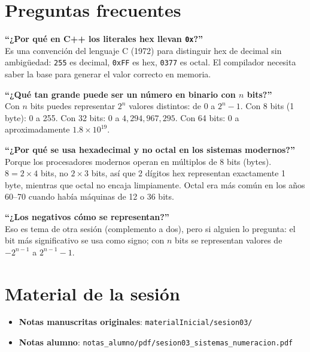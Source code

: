 \documentclass[12pt, oneside]{article}
\begin{document}
\section{Preguntas frecuentes}

\begin{notaprofesor}[FAQ]

\textbf{``¿Por qué en C++ los literales hex llevan \texttt{0x}?''}\\
Es una convención del lenguaje C (1972) para distinguir hex de decimal sin
ambigüedad: \texttt{255} es decimal, \texttt{0xFF} es hex, \texttt{0377}
es octal. El compilador necesita saber la base para generar el valor
correcto en memoria.

\vspace{0.6em}
\textbf{``¿Qué tan grande puede ser un número en binario con $n$ bits?''}\\
Con $n$ bits puedes representar $2^n$ valores distintos: de 0 a $2^n - 1$.
Con 8 bits (1 byte): 0 a 255. Con 32 bits: 0 a $4{,}294{,}967{,}295$.
Con 64 bits: 0 a aproximadamente $1.8 \times 10^{19}$.

\vspace{0.6em}
\textbf{``¿Por qué se usa hexadecimal y no octal en los sistemas modernos?''}\\
Porque los procesadores modernos operan en múltiplos de 8 bits (bytes).
$8 = 2 \times 4$ bits, no $2 \times 3$ bits, así que 2 dígitos hex
representan exactamente 1 byte, mientras que octal no encaja limpiamente.
Octal era más común en los años 60–70 cuando había máquinas de 12 o 36 bits.

\vspace{0.6em}
\textbf{``¿Los negativos cómo se representan?''}\\
Eso es tema de otra sesión (complemento a dos), pero si alguien lo pregunta:
el bit más significativo se usa como signo; con $n$ bits se representan
valores de $-2^{n-1}$ a $2^{n-1}-1$.
\end{notaprofesor}

\section{Material de la sesión}

\begin{itemize}
  \item \textbf{Notas manuscritas originales}: \texttt{materialInicial/sesion03/}
  \item \textbf{Notas alumno}: \texttt{notas\_alumno/pdf/sesion03\_sistemas\_numeracion.pdf}
\end{itemize}
\end{document}
